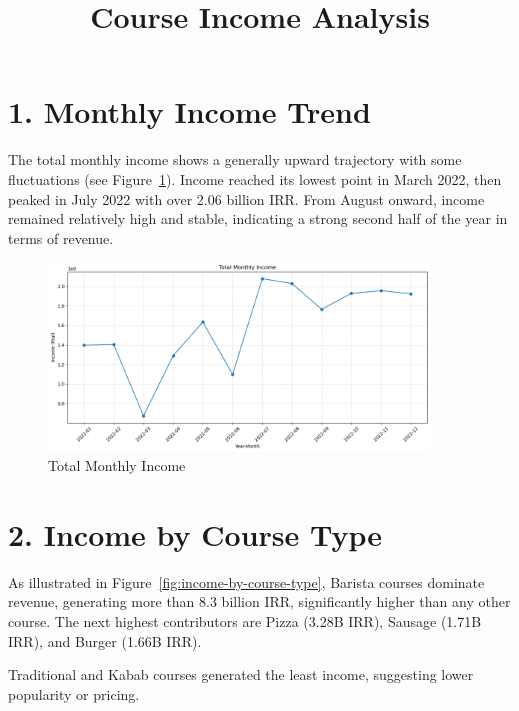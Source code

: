 \documentclass[12pt,a4paper]{article}
\title{Course Income Analysis}
\date{}
\begin{document}
\maketitle

\section*{1. Monthly Income Trend}

The total monthly income shows a generally upward trajectory with some fluctuations (see Figure~\ref{fig:monthly-income}). Income reached its lowest point in March 2022, then peaked in July 2022 with over 2.06 billion IRR. From August onward, income remained relatively high and stable, indicating a strong second half of the year in terms of revenue.

\begin{figure}[h!]
    \centering
    \includegraphics[width=0.90\textwidth]{Total Monthly Income.png}
    \caption{Total Monthly Income}
    \label{fig:monthly-income}
\end{figure}

\section*{2. Income by Course Type}

As illustrated in Figure~\ref{fig:income-by-course-type}, Barista courses dominate revenue, generating more than 8.3 billion IRR, significantly higher than any other course. The next highest contributors are Pizza (3.28B IRR), Sausage (1.71B IRR), and Burger (1.66B IRR).

Traditional and Kabab courses generated the least income, suggesting lower popularity or pricing.
\end{document}
